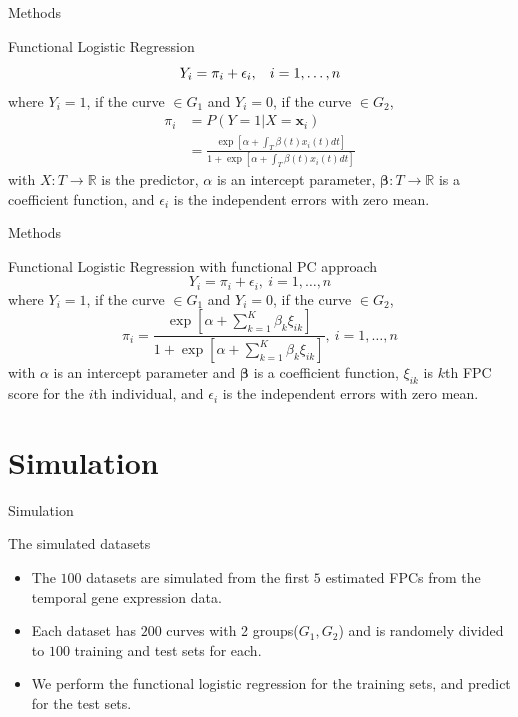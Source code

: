 \documentclass{beamer}
\begin{document}
\begin{frame}{Methods}
	\begin{block}{Functional Logistic Regression}
		\vspace{0.1cm}
		$$ Y_i = \pi_i + \epsilon_i, \hspace{0.3cm} i=1,\dots,n $$
		where $Y_i=1$, if the curve $\in G_1$ and $Y_i=0$, if the curve $\in G_2$,
		$$ \begin{aligned}
		   \pi_i &= P(Y=1|X=\boldsymbol{x}_i)\\
			 	  &= \frac{ \exp[\alpha + \int_T \beta(t)x_i(t) dt] }{1 + \exp[\alpha + \int_T \beta(t)x_i(t) dt]}
		\end{aligned}  $$
		with $X:T \rightarrow \mathbb{R}$ is the predictor, $\alpha$ is an intercept parameter, $\boldsymbol\beta : T \rightarrow \mathbb{R}$ is a coefficient function, and $\epsilon_i$ is the independent errors with zero mean.
	\end{block}
\end{frame}

\begin{frame}{Methods}
	\begin{block}{Functional Logistic Regression with functional PC approach}
		\vspace{0.1cm}
		$$ Y_i = \pi_i + \epsilon_i, \ i=1,\dots,n $$
		where $Y_i=1$, if the curve $\in G_1$ and $Y_i=0$, if the curve $\in G_2$,
		$$ \pi_i = \frac{ \exp[\alpha + \sum_{k=1}^K \beta_k\xi_{ik}] }{1 + \exp[\alpha + \sum_{k=1}^K \beta_k\xi_{ik}]}, \ i=1,\dots,n $$
		with $\alpha$ is an intercept parameter and $\boldsymbol\beta$ is a coefficient function, $\xi_{ik}$ is $k$th FPC score for the $i$th individual, and $\epsilon_i$ is the independent errors with zero mean.
	\end{block}
\end{frame}



\section{Simulation}
\begin{frame}{Simulation}
	\begin{block}{The simulated datasets}
		\vspace{0.1cm}
		\begin{itemize}
			\item {
				The $100$ datasets are simulated from the first $5$ estimated FPCs from the temporal gene expression data.
			}
			\item {
				 Each dataset has $200$ curves with 2 groups($G_1, G_2$)
				 and is randomely divided to $100$ training and test sets for each.
			}
			\item {
				We perform the functional logistic regression for the training sets, and predict for the test sets.
			}
		\end{itemize}
	\end{block}
\end{frame}
\end{document}
